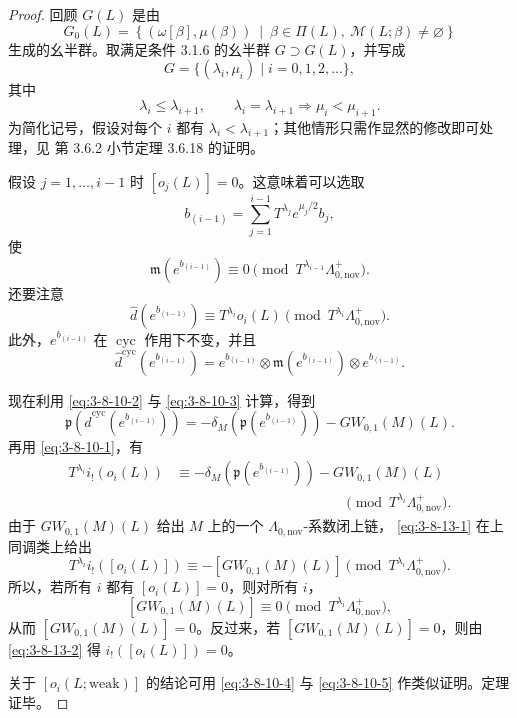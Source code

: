 \begin{proof}
回顾 $G(L)$ 是由
\[
 G_0(L)
 =
 \left\{
 (\omega[\beta],\mu(\beta))
 \ \middle|\
 \beta\in\Pi(L),\ 
 \mathcal M(L;\beta)\ne\varnothing
 \right\}
\]
生成的幺半群。取满足条件 3.1.6 的幺半群 $G\supset G(L)$，并写成
\[
 G=\{(\lambda_i,\mu_i)\mid i=0,1,2,\ldots\},
\]
其中
\[
 \lambda_i\leq\lambda_{i+1},
 \qquad
 \lambda_i=\lambda_{i+1}\Longrightarrow\mu_i<\mu_{i+1}.
\]
为简化记号，假设对每个 $i$ 都有
$\lambda_i<\lambda_{i+1}$；其他情形只需作显然的修改即可处理，见
第 3.6.2 小节定理 3.6.18 的证明。

假设 $j=1,\ldots,i-1$ 时 $[o_j(L)]=0$。这意味着可以选取
\[
 b_{(i-1)}
 =
 \sum_{j=1}^{i-1}
 T^{\lambda_j}e^{\mu_j/2}b_j,
\]
使
\[
 \mathfrak m(e^{b_{(i-1)}})
 \equiv0
 \pmod{T^{\lambda_{i-1}}\Lambda^+_{0,\mathrm{nov}}}.
\]
还要注意
\[
 \widehat d(e^{b_{(i-1)}})
 \equiv
 T^{\lambda_i}o_i(L)
 \pmod{T^{\lambda_i}\Lambda^+_{0,\mathrm{nov}}}.
\]
此外，$e^{b_{(i-1)}}$ 在 $\operatorname{cyc}$ 作用下不变，并且
\[
 \widehat d^{\mathrm{cyc}}(e^{b_{(i-1)}})
 =
 e^{b_{(i-1)}}\otimes
 \mathfrak m(e^{b_{(i-1)}})\otimes
 e^{b_{(i-1)}}.
\]

现在利用 \eqref{eq:3-8-10-2} 与 \eqref{eq:3-8-10-3} 计算，得到
\[
 \mathfrak p\left(
 \widehat d^{\mathrm{cyc}}(e^{b_{(i-1)}})
 \right)
 =
 -\delta_M\left(\mathfrak p(e^{b_{(i-1)}})\right)
 -GW_{0,1}(M)(L).
\]
再用 \eqref{eq:3-8-10-1}，有
\begin{equation}
\begin{aligned}
 T^{\lambda_i}i_!(o_i(L))
 &\equiv
 -\delta_M\left(\mathfrak p(e^{b_{(i-1)}})\right)
 -GW_{0,1}(M)(L)\\
 &\hspace{12em}
 \pmod{T^{\lambda_i}\Lambda^+_{0,\mathrm{nov}}}.
\end{aligned}
\tag{3.8.13.1}\label{eq:3-8-13-1}
\end{equation}
由于 $GW_{0,1}(M)(L)$ 给出 $M$ 上的一个
$\Lambda_{0,\mathrm{nov}}$-系数闭上链，
\eqref{eq:3-8-13-1} 在上同调类上给出
\begin{equation}
 T^{\lambda_i}i_!([o_i(L)])
 \equiv
 -[GW_{0,1}(M)(L)]
 \pmod{T^{\lambda_i}\Lambda^+_{0,\mathrm{nov}}}.
\tag{3.8.13.2}\label{eq:3-8-13-2}
\end{equation}
所以，若所有 $i$ 都有 $[o_i(L)]=0$，则对所有 $i$，
\[
 [GW_{0,1}(M)(L)]
 \equiv0
 \pmod{T^{\lambda_i}\Lambda^+_{0,\mathrm{nov}}},
\]
从而 $[GW_{0,1}(M)(L)]=0$。反过来，若
$[GW_{0,1}(M)(L)]=0$，则由 \eqref{eq:3-8-13-2} 得
$i_!([o_i(L)])=0$。

关于 $[o_i(L;\mathrm{weak})]$ 的结论可用
\eqref{eq:3-8-10-4} 与 \eqref{eq:3-8-10-5} 作类似证明。定理证毕。
\end{proof}

